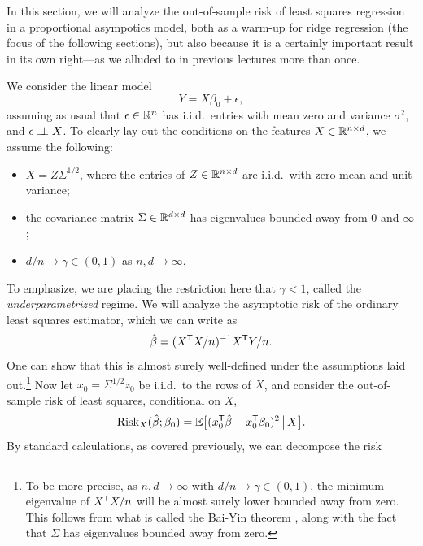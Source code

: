 \documentclass{article}
\begin{document}
\def\Risk{\mathrm{Risk}}

In this section, we will analyze the out-of-sample risk of least squares
regression in a proportional asympotics model, both as a warm-up for ridge
regression (the focus of the following sections), but also because it is a
certainly important result in its own right---as we alluded to in previous
lectures more than once. 

We consider the linear model
\begin{equation}
\label{eq:model}
Y = X\beta_0 + \epsilon,
\end{equation}
assuming as usual that $\epsilon \in \mathbb{R}^n$ has i.i.d.\ entries with mean zero
and variance $\sigma^2$, and $\epsilon \perp\!\!\!\perp X$. To clearly lay out the
conditions on the features $X \in \mathbb{R}^{n \times d}$, we assume the following: 
\begin{itemize}
\item[(A1)] $X = Z \Sigma^{1/2}$, where the entries of $Z \in \mathbb{R}^{n \times d}$
  are i.i.d.\ with zero mean and unit variance;
\item[(A2)] the covariance matrix $\Sigma \in \mathbb{R}^{d \times d}$ has eigenvalues
  bounded away from $0$ and $\infty$;  
\item[(A3)] $d/n \to \gamma \in (0,1)$ as $n,d \to \infty$,
\end{itemize}
To emphasize, we are placing the restriction here that $\gamma < 1$, called the
\emph{underparametrized} regime. We will analyze the asymptotic risk of the
ordinary least squares estimator, which we can write as 
\begin{equation}
\label{eq:ls_rescaled}
\hat{\beta} = (X^{\mathsf{T}} X/n)^{-1} X^{\mathsf{T}} Y/n.
\end{equation}
One can show that this is almost surely well-defined under the assumptions laid
out.\footnote{To be more precise, as $n,d \to \infty$ with $d/n \to \gamma \in
  (0,1)$, the minimum eigenvalue of $X^{\mathsf{T}} X/n$ will be almost surely lower
  bounded away from zero. This follows from what is called the Bai-Yin theorem 
  \citep{bai1993limit}, along with the fact that $\Sigma$ has eigenvalues
  bounded away from zero.}  
Now let $x_0 = \Sigma^{1/2} z_0$ be i.i.d.\ to the rows of $X$, and consider the
out-of-sample risk of least squares, conditional on $X$,
\begin{equation}
\label{eq:risk}
\Risk_X(\hbeta; \beta_0) = \E \big[ ( x_0^\T \hbeta - x_0^\T \beta_0 )^2
\,\big|\, X \big].
\end{equation}
By standard calculations, as covered previously, we can decompose the risk
\end{document}
